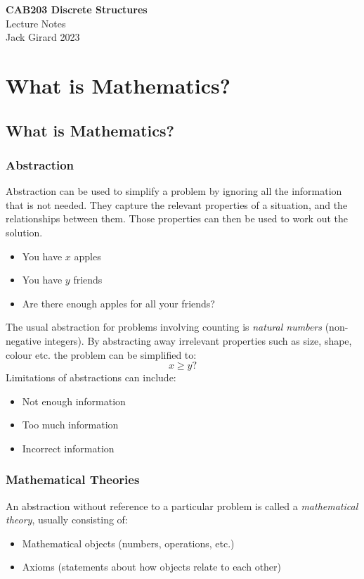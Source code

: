 \documentclass{article}
\begin{document}
\begin{titlepage}
    \begin{center}
        \LARGE{\textbf{CAB203 Discrete Structures}} \\[0.2in]
        \LARGE{Lecture Notes} \\[0.1in]
        \large{Jack Girard 2023}
    \end{center}
\end{titlepage}

\newpage

\tableofcontents
\newpage

\section{What is Mathematics?}
\subsection{What is Mathematics?}
\subsubsection{Abstraction}
Abstraction can be used to simplify a problem by ignoring all the information that is not needed.
They capture the relevant properties of a situation, and the relationships between them.
Those properties can then be used to work out the solution.
\begin{itemize}
    \item You have \(x\) apples
    \item You have \(y\) friends
    \item Are there enough apples for all your friends?
\end{itemize}
The usual abstraction for problems involving counting is \emph{natural numbers} (non-negative integers).
By abstracting away irrelevant properties such as size, shape, colour etc. the problem can be simplified to:
\[x \geq y?\]
Limitations of abstractions can include:
\begin{itemize}
    \item Not enough information
    \item Too much information
    \item Incorrect information
\end{itemize}
%
\subsubsection{Mathematical Theories}
An abstraction without reference to a particular problem is called a \emph{mathematical theory}, usually consisting of:
\begin{itemize}
    \item Mathematical objects (numbers, operations, etc.)
    \item Axioms (statements about how objects relate to each other)
\end{itemize}
%
\newpage
\end{document}
